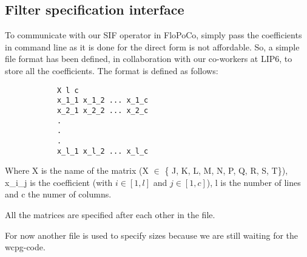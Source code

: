 		\subsection{Filter specification interface}
		To communicate with our SIF operator in FloPoCo, simply pass the coefficients in command line as it is done for the direct form is not affordable.
		So, a simple file format has been defined, in collaboration with our co-workers at LIP6, to store all the coefficients.
		The format is defined as follows:

		\begin{verbatim}
			X l c
			x_1_1 x_1_2 ... x_1_c
			x_2_1 x_2_2 ... x_2_c
			.
			.
			.
			x_l_1 x_l_2 ... x_l_c
		\end{verbatim}

		Where X is the name of the matrix (X $\in$ \{ J, K, L, M, N, P, Q, R, S, T\}), x\_i\_j is the coefficient (with $i \in [1, l]$ and $j \in [1, c]$), l is the number of lines and c the numer of columns.

		All the matrices are specified after each other in the file.

		For now another file is used to specify sizes because we are still waiting for the wcpg-code.



